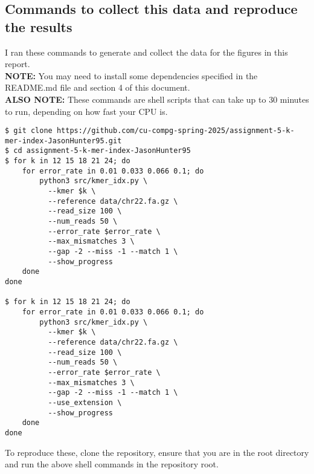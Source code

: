 \documentclass[11pt, letterpaper]{article}
\begin{document}
\subsection{Commands to collect this data and reproduce the results}
I ran these commands to generate and collect the data for the figures in this report. \\
\textbf{NOTE:} You may need to install some dependencies specified in the README.md file and section 4 of this document. \\
\textbf{ALSO NOTE:} These commands are shell scripts that can take up to 30 minutes to run, 
depending on how fast your CPU is.
\begin{verbatim}
$ git clone https://github.com/cu-compg-spring-2025/assignment-5-k-mer-index-JasonHunter95.git
$ cd assignment-5-k-mer-index-JasonHunter95
$ for k in 12 15 18 21 24; do
    for error_rate in 0.01 0.033 0.066 0.1; do
        python3 src/kmer_idx.py \
          --kmer $k \
          --reference data/chr22.fa.gz \
          --read_size 100 \
          --num_reads 50 \
          --error_rate $error_rate \
          --max_mismatches 3 \
          --gap -2 --miss -1 --match 1 \
          --show_progress
    done
done

$ for k in 12 15 18 21 24; do
    for error_rate in 0.01 0.033 0.066 0.1; do
        python3 src/kmer_idx.py \
          --kmer $k \
          --reference data/chr22.fa.gz \
          --read_size 100 \
          --num_reads 50 \
          --error_rate $error_rate \
          --max_mismatches 3 \
          --gap -2 --miss -1 --match 1 \
          --use_extension \
          --show_progress
    done
done
\end{verbatim}

To reproduce these, clone the repository, 
ensure that you are in the root directory and run the above shell commands
in the repository root.
\end{document}
